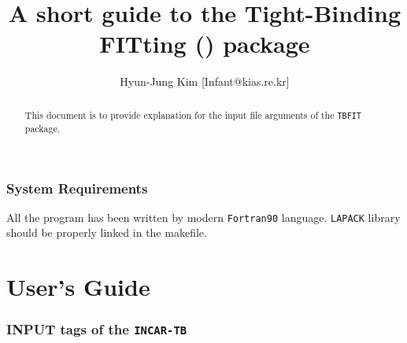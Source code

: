 \documentclass[a4paper,12pt]{scrartcl}
\title{A short guide to the Tight-Binding FITting (\tbfitname{}) package}
\author{Hyun-Jung Kim [Infant@kias.re.kr]}
\newcommand{\tbfitname}{\textcolor{blue!85!white}{\texttt{TBFIT}}}
\begin{document}
\maketitle

\begin{abstract}
This document is to provide explanation for the input file arguments of the \tbfitname{} package.

\end{abstract}
\section*{System Requirements}
All the program has been written by modern \texttt{Fortran90} language. \texttt{LAPACK} library should be properly linked in the makefile.

\newpage
\part{User's Guide}

\section{INPUT tags of the \texttt{INCAR-TB}}
\end{document}
